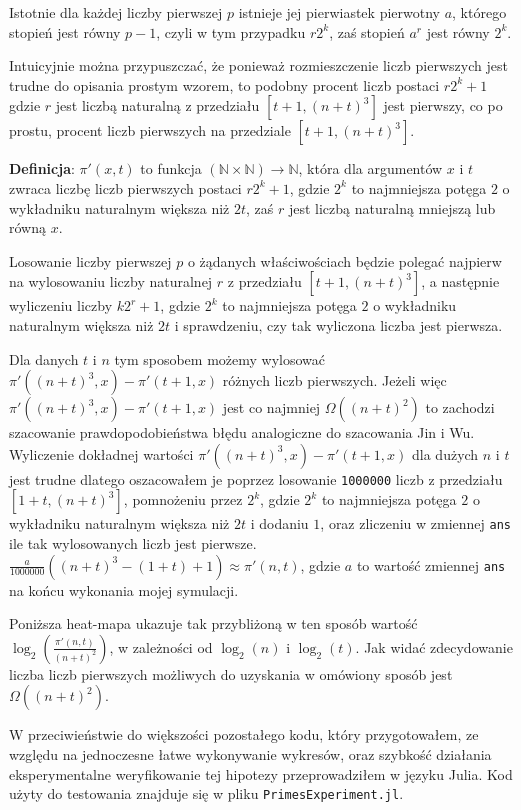 \documentclass{article}
\begin{document}
Istotnie dla każdej liczby pierwszej $p$ istnieje jej pierwiastek pierwotny $a$,
którego stopień jest równy $p-1$, czyli w tym przypadku $r2^k$, zaś stopień $a^r$ jest równy $2^k$.


Intuicyjnie można przypuszczać, że ponieważ rozmieszczenie liczb pierwszych jest trudne 
do opisania prostym wzorem, to podobny procent liczb postaci $r2^k+1$ gdzie $r$ jest liczbą
naturalną z przedziału $[t+1,(n+t)^3]$ jest pierwszy, co po prostu, procent liczb 
pierwszych na przedziale $[t+1,(n+t)^3]$. 

\begin{tcolorbox}
    \textbf{Definicja}: $\pi'(x,t)$ to funkcja $(\mathbb{N} \times \mathbb{N}) \to \mathbb{N}$, która dla argumentów $x$ i
    $t$ zwraca liczbę liczb pierwszych postaci $r2^k+1$, gdzie $2^k$ to najmniejsza potęga $2$ o wykładniku naturalnym
    większa niż $2t$, zaś $r$ jest liczbą naturalną mniejszą lub równą $x$.
\end{tcolorbox}

Losowanie liczby pierwszej $p$ o żądanych właściwościach będzie polegać najpierw na wylosowaniu liczby naturalnej $r$
z przedziału $[t+1,(n+t)^3]$, a następnie wyliczeniu liczby $k2^r+1$, gdzie $2^k$ to najmniejsza potęga $2$ o wykładniku naturalnym większa niż $2t$ i sprawdzeniu, czy 
tak wyliczona liczba jest pierwsza.

Dla danych $t$ i $n$ tym sposobem możemy wylosować $\pi'((n+t)^3,x)-\pi'(t+1,x)$ różnych liczb pierwszych. Jeżeli 
więc $\pi'((n+t)^3,x)-\pi'(t+1,x)$ jest co najmniej $\Omega((n+t)^2)$ to zachodzi szacowanie prawdopodobieństwa błędu analogiczne do szacowania 
Jin i Wu. Wyliczenie dokładnej wartości $\pi'((n+t)^3,x)-\pi'(t+1,x)$ dla dużych $n$ i $t$ jest trudne 
dlatego oszacowałem je poprzez losowanie \texttt{1000000} liczb z przedziału $[1+t,(n+t)^3]$, pomnożeniu przez $2^k$, gdzie $2^k$ to najmniejsza potęga $2$ o wykładniku naturalnym
większa niż $2t$ i dodaniu $1$, oraz zliczeniu w zmiennej \texttt{ans} ile tak wylosowanych liczb jest pierwsze. 
$\frac{a}{1000000}((n+t)^3-(1+t)+1) \approx \pi'(n,t)$, gdzie $a$ to wartość zmiennej \texttt{ans} na końcu wykonania mojej symulacji.

Poniższa heat-mapa ukazuje tak przybliżoną w ten sposób wartość $\log_2(\frac{\pi'(n,t)}{(n+t)^2})$, w zależności od $\log_2(n)$ i $\log_2(t)$. 
Jak widać zdecydowanie liczba liczb pierwszych możliwych do uzyskania w omówiony sposób
jest $\Omega((n+t)^2)$.

W przeciwieństwie do większości pozostałego kodu, który przygotowałem, ze względu na jednoczesne łatwe wykonywanie wykresów, oraz szybkość działania 
eksperymentalne weryfikowanie
tej hipotezy przeprowadziłem w języku Julia. Kod użyty do testowania znajduje się  w pliku \texttt{PrimesExperiment.jl}.
\end{document}
